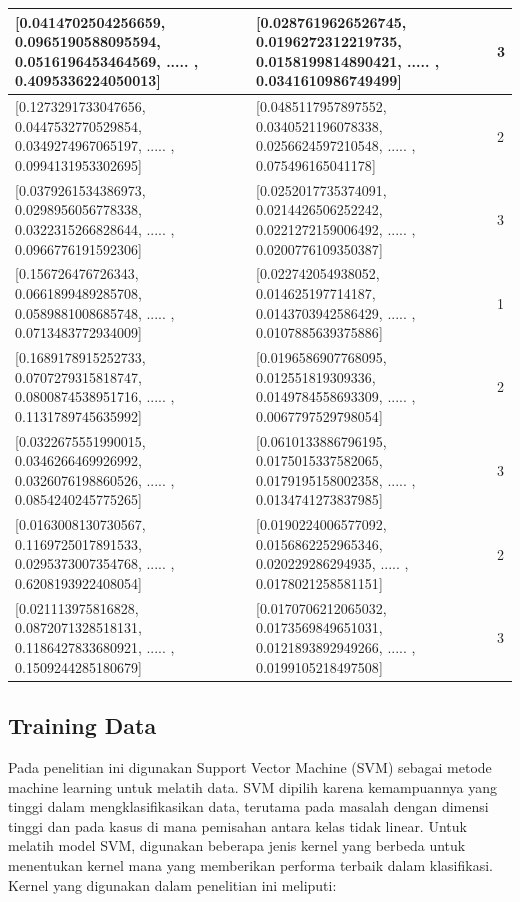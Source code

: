 \begin{table}[]
{\begin{tabular}{@{}|l|l|l|@{}}
      {[}0.0414702504256659, 0.0965190588095594, 0.0516196453464569, ..... , 0.4095336224050013{]}  & {[}0.0287619626526745, 0.0196272312219735, 0.0158199814890421, ..... , 0.0341610986749499{]}  & 3              \\ \midrule
      {[}0.1273291733047656, 0.0447532770529854, 0.0349274967065197, ..... , 0.0994131953302695{]}  & {[}0.0485117957897552, 0.0340521196078338, 0.0256624597210548, ..... , 0.075496165041178{]}   & 2              \\ \midrule
      {[}0.0379261534386973, 0.0298956056778338, 0.0322315266828644, ..... , 0.0966776191592306{]}  & {[}0.0252017735374091, 0.0214426506252242, 0.0221272159006492, ..... , 0.0200776109350387{]}  & 3              \\ \midrule
      {[}0.156726476726343, 0.0661899489285708, 0.0589881008685748, ..... , 0.0713483772934009{]}   & {[}0.022742054938052, 0.014625197714187, 0.0143703942586429, ..... , 0.0107885639375886{]}    & 1              \\ \midrule
      {[}0.1689178915252733, 0.0707279315818747, 0.0800874538951716, ..... , 0.1131789745635992{]}  & {[}0.0196586907768095, 0.012551819309336, 0.0149784558693309, ..... , 0.0067797529798054{]}   & 2              \\ \midrule
      {[}0.0322675551990015, 0.0346266469926992, 0.0326076198860526, ..... , 0.0854240245775265{]}  & {[}0.0610133886796195, 0.0175015337582065, 0.0179195158002358, ..... , 0.0134741273837985{]}  & 3              \\ \midrule
      {[}0.0163008130730567, 0.1169725017891533, 0.0295373007354768, ..... , 0.6208193922408054{]}  & {[}0.0190224006577092, 0.0156862252965346, 0.020229286294935, ..... , 0.0178021258581151{]}   & 2              \\ \midrule
      {[}0.021113975816828, 0.0872071328518131, 0.1186427833680921, ..... , 0.1509244285180679{]}   & {[}0.0170706212065032, 0.0173569849651031, 0.0121893892949266, ..... , 0.0199105218497508{]}  & 3              \\ \bottomrule
      \end{tabular}%
    }


    \end{table}

\subsection{Training Data}
\label{subsec:trainingData}

Pada penelitian ini digunakan Support Vector Machine (SVM) sebagai metode machine learning  untuk melatih data. SVM dipilih karena kemampuannya yang tinggi dalam mengklasifikasikan data, terutama pada masalah dengan dimensi tinggi dan pada kasus di mana pemisahan antara kelas tidak linear.
Untuk melatih model SVM, digunakan beberapa jenis kernel yang berbeda untuk menentukan kernel mana yang memberikan performa terbaik dalam klasifikasi. Kernel yang digunakan dalam penelitian ini meliputi:

